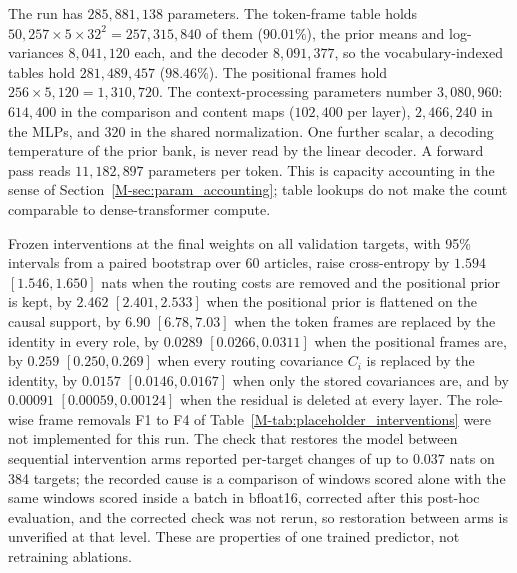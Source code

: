 \documentclass[twoside,11pt]{article}
\begin{document}
The run has $285{,}881{,}138$ parameters. The token-frame table holds $50{,}257\times5\times32^2=257{,}315{,}840$ of them ($90.01\%$), the prior means and log-variances $8{,}041{,}120$ each, and the decoder $8{,}091{,}377$, so the vocabulary-indexed tables hold $281{,}489{,}457$ ($98.46\%$). The positional frames hold $256\times5{,}120=1{,}310{,}720$. The context-processing parameters number $3{,}080{,}960$: $614{,}400$ in the comparison and content maps ($102{,}400$ per layer), $2{,}466{,}240$ in the MLPs, and $320$ in the shared normalization. One further scalar, a decoding temperature of the prior bank, is never read by the linear decoder. A forward pass reads $11{,}182{,}897$ parameters per token. This is capacity accounting in the sense of Section~\ref{M-sec:param_accounting}; table lookups do not make the count comparable to dense-transformer compute.

Frozen interventions at the final weights on all validation targets, with 95\% intervals from a paired bootstrap over 60 articles, raise cross-entropy by $1.594$ $[1.546,1.650]$ nats when the routing costs are removed and the positional prior is kept, by $2.462$ $[2.401,2.533]$ when the positional prior is flattened on the causal support, by $6.90$ $[6.78,7.03]$ when the token frames are replaced by the identity in every role, by $0.0289$ $[0.0266,0.0311]$ when the positional frames are, by $0.259$ $[0.250,0.269]$ when every routing covariance $C_i$ is replaced by the identity, by $0.0157$ $[0.0146,0.0167]$ when only the stored covariances are, and by $0.00091$ $[0.00059,0.00124]$ when the residual is deleted at every layer. The role-wise frame removals F1 to F4 of Table~\ref{M-tab:placeholder_interventions} were not implemented for this run. The check that restores the model between sequential intervention arms reported per-target changes of up to $0.037$ nats on 384 targets; the recorded cause is a comparison of windows scored alone with the same windows scored inside a batch in bfloat16, corrected after this post-hoc evaluation, and the corrected check was not rerun, so restoration between arms is unverified at that level. These are properties of one trained predictor, not retraining ablations.
\end{document}
